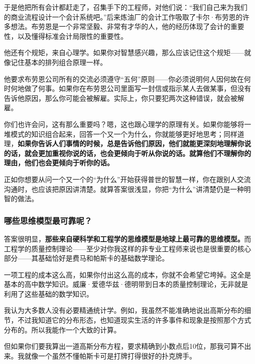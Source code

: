 于是他把所有会计都赶走了，召集手下的工程师，对他们说：“我们自己来为我们的商业流程设计一个会计系统吧。”后来炼油厂的会计工作吸取了卡尔·布劳恩的许多想法。布劳恩是一个非常坚毅、非常有才华的人，他的经历体现了会计的重要性，以及懂得标准会计局限性的重要性。
\par

他还有个规矩，来自心理学。如果你对智慧感兴趣，那么应该记住这个规矩——就像记住基本的排列组合原理一样。
\par

他要求布劳恩公司所有的交流必须遵守“五何”原则——你必须说明何人因何故在何时何地做了何事。如果你在布劳恩公司里面写一封信或指示某人去做某事，但没有告诉他原因，那么你可能会被解雇。实际上，你只要犯两次这种错误，就会被解雇。
\par

你们也许会问，这有那么重要吗？嗯，这也跟心理学的原理有关。如果你能够将一堆模式的知识组合起来，回答一个又一个为什么，你就能够更好地思考；同样道理，\textbf{如果你告诉人们事情的时候，总是告诉他们原因，他们就能更深刻地理解你说的话，就会更加重视你说的话，也会更倾向于听从你说的话。就算他们不理解你的理由，他们也会更倾向于听你的话。}
\par

正如你想要从问一个又一个的“为什么”开始获得普世的智慧一样，你在跟别人交流沟通时，也应该把原因讲清楚。就算答案很浅显，你把“为什么”讲清楚仍是一种明智的做法。
\par

\subsubsection*{哪些思维模型最可靠呢？}

答案很明显，\textbf{那些来自硬科学和工程学的思维模型是地球上最可靠的思维模型。}而工程学的质量控制理论——至少对你我这样的非专业工程师来说也是很重要的核心部分——其基础恰好是费马和帕斯卡的基础数学理论。
\par

一项工程的成本这么高，如果你付出这么高的成本，你就不会希望它垮掉。这全是基本的高中数学知识。威廉·爱德华兹·德明带到日本的质量控制理论，无非就是利用了这些基础的数学知识。
\par

我认为大多数人没有必要精通统计学。例如，我虽然不能准确地说出高斯分布的细节，不过我知道它的分布形态，也知道现实生活的许多事件和现象是按照那个方式分布的。所以我能作一个大致的计算。
\par

但如果你们要我算出一道高斯分布方程，要求精确到小数点后10位，那我可算不出来。我就像一个虽然不懂帕斯卡可是打牌打得很好的扑克牌手。
\par


